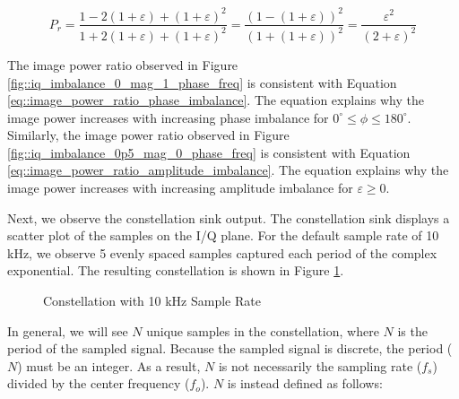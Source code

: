 \documentclass{article}
\begin{document}
\begin{equation}
	P_r = \frac{1-2(1+\varepsilon)+(1+\varepsilon)^2}{1+2(1+\varepsilon)+(1+\varepsilon)^2} = \frac{(1-(1+\varepsilon))^2}{(1+(1+\varepsilon))^2} = \frac{\varepsilon^2}{(2+\varepsilon)^2} \label{eq::image_power_ratio_amplitude_imbalance}
\end{equation}

The image power ratio observed in Figure \ref{fig::iq_imbalance_0_mag_1_phase_freq} is consistent with Equation \ref{eq::image_power_ratio_phase_imbalance}. The equation explains why the image power increases with increasing phase imbalance for $0^{\circ} \leq \phi \leq 180^{\circ}$. Similarly, the image power ratio observed in Figure \ref{fig::iq_imbalance_0p5_mag_0_phase_freq} is consistent with Equation \ref{eq::image_power_ratio_amplitude_imbalance}. The equation explains why the image power increases with increasing amplitude imbalance for $\varepsilon \geq 0$.

Next, we observe the constellation sink output. The constellation sink displays a scatter plot of the samples on the I/Q plane. For the default sample rate of 10 kHz, we observe 5 evenly spaced samples captured each period of the complex exponential. The resulting constellation is shown in Figure \ref{fig::iq_imbalance_0_mag_0_phase_10k_samp_rate_const}.
 
\begin{figure}[H]
	\centerline{}
	\caption{Constellation with 10 kHz Sample Rate}
	\label{fig::iq_imbalance_0_mag_0_phase_10k_samp_rate_const}
\end{figure}

In general, we will see $N$ unique samples in the constellation, where $N$ is the period of the sampled signal. Because the sampled signal is discrete, the period ($N$) must be an integer. As a result, $N$ is not necessarily the sampling rate ($f_s$) divided by the center frequency ($f_o$). $N$ is instead defined as follows:
\end{document}
